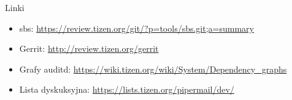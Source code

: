 \documentclass[presentation,aspectratio=43,12pt]{beamer}
\begin{document}
\begin{frame}[label=sec-7-3]{Linki}
\begin{itemize}
\item sbs: \url{https://review.tizen.org/git/?p=tools/sbs.git;a=summary}

\item Gerrit:  \url{http://review.tizen.org/gerrit}

\item Grafy auditd: \url{https://wiki.tizen.org/wiki/System/Dependency_graphs}

\item Lista dyskuksyjna: \url{https://lists.tizen.org/pipermail/dev/}
\end{itemize}
\end{frame}
\end{document}
